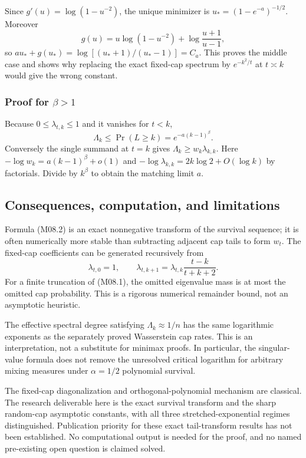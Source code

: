 \documentclass[11pt,a4paper]{article}
\theoremstyle{definition}\newtheorem{definition}[theorem]{Definition}
\theoremstyle{remark}\newtheorem{remark}[theorem]{Remark}
\numberwithin{equation}{section}
\begin{document}
Since $g'(u)=\log(1-u^{-2})$, the unique minimizer is
$u_*=(1-e^{-a})^{-1/2}$. Moreover
\[
 g(u)=u\log(1-u^{-2})+\log\frac{u+1}{u-1},
\]
so $a u_*+g(u_*)=\log[(u_*+1)/(u_*-1)]=C_a$.
This proves the middle case and shows why replacing the exact fixed-cap spectrum by $e^{-k^2/t}$ at $t\asymp k$ would give the wrong constant.

\subsubsection{Proof for $\beta>1$}
Because $0\le\lambda_{t,k}\le1$ and it vanishes for $t<k$,
\[
 \Lambda_k\le\Pr(L\ge k)=e^{-a(k-1)^\beta}.
\]
Conversely the single summand at $t=k$ gives $\Lambda_k\ge w_k\lambda_{k,k}$. Here
$-\log w_k=a(k-1)^\beta+o(1)$ and
$-\log\lambda_{k,k}=2k\log2+O(\log k)$ by factorials. Divide by $k^\beta$ to obtain the matching limit $a$.

\subsection{Consequences, computation, and limitations}\label{M08-sec-5}
Formula (M08.2) is an exact nonnegative transform of the survival sequence; it is often numerically more stable than subtracting adjacent cap tails to form $w_t$. The fixed-cap coefficients can be generated recursively from
\[
 \lambda_{t,0}=1,\qquad
 \lambda_{t,k+1}=\lambda_{t,k}\frac{t-k}{t+k+2}.
\]
For a finite truncation of (M08.1), the omitted eigenvalue mass is at most the omitted cap probability. This is a rigorous numerical remainder bound, not an asymptotic heuristic.

The effective spectral degree satisfying $\Lambda_k\approx1/n$ has the same logarithmic exponents as the separately proved Wasserstein cap rates. This is an interpretation, not a substitute for minimax proofs. In particular, the singular-value formula does not remove the unresolved critical logarithm for arbitrary mixing measures under $\alpha=1/2$ polynomial survival.

The fixed-cap diagonalization and orthogonal-polynomial mechanism are classical. The research deliverable here is the exact survival transform and the sharp random-cap asymptotic constants, with all three stretched-exponential regimes distinguished. Publication priority for these exact tail-transform results has not been established. No computational output is needed for the proof, and no named pre-existing open question is claimed solved.
\end{document}
